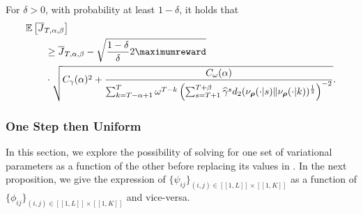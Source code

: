 \begin{prop}
    For $\delta>0$, with probability at least $1-\delta$, it holds that 
\begin{align*}
    &\mathbb{E}\left[\overline{J}_{T,\alpha,\beta} \right] 
    \\
    &\qquad\geq 
    \overline{J}_{T,\alpha,\beta} - \sqrt{
            \frac{1-\delta}{\delta} 2\maximumreward}
    \\
    &\qquad\cdot\sqrt{C_\gamma(\alpha)^2 +
            \frac{ C_\omega(\alpha)}{\sum_{ k=T-\alpha+1}^{ T}\omega^{T-k} \left(\sum_{ s=T+1}^{ T+\beta} \widehat{\gamma}^s d_2(\nu_{\boldsymbol\rho}(\cdot\vert s)\Vert \nu_{\boldsymbol\rho}(\cdot\vert k))^{\frac{1}{2}}\right)^{-2} }}.
\end{align*}
\end{prop}


\subsubsection{One Step then Uniform}
In this section, we explore the possibility of solving for one set of variational parameters as a function of the other before replacing its values in . 
In the next proposition, we give the expression of $\{\psi_{ij}\}_{(i,j)\in[\![1,L]\!]\times [\![1,K]\!]}$ as a function of $\{\phi_{ij}\}_{(i,j)\in[\![1,L]\!]\times [\![1,K]\!]}$ and vice-versa.

